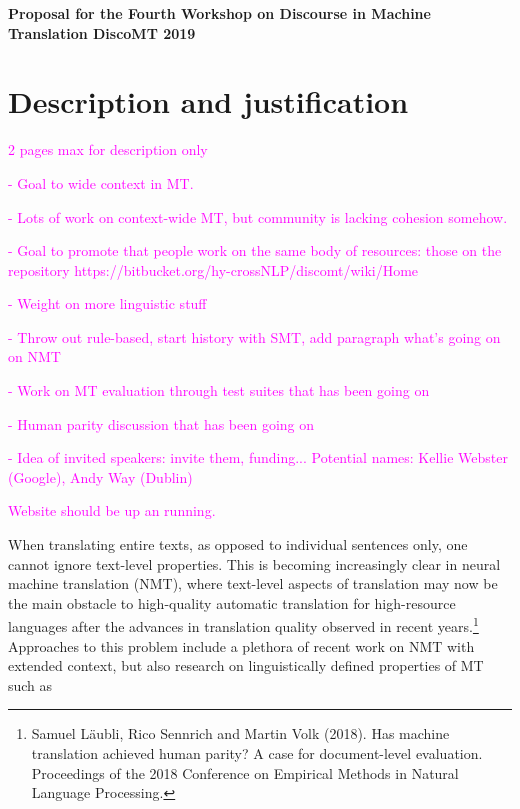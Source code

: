 \documentclass[11pt]{article}
\begin{document}
\begin{center}
\Large{\textbf{Proposal for the Fourth Workshop on Discourse in Machine Translation DiscoMT 2019}}
\end{center}

\section{Description and justification}

\textcolor{magenta}{2 pages max for description only}

\textcolor{magenta}{- Goal to wide context in MT.} 

\textcolor{magenta}{- Lots of work on context-wide MT, but community is lacking cohesion somehow.}

\textcolor{magenta}{- Goal to promote that people work on the same body of resources: those on the repository https://bitbucket.org/hy-crossNLP/discomt/wiki/Home } 

\textcolor{magenta}{- Weight on more linguistic stuff}

\textcolor{magenta}{- Throw out rule-based, start history with SMT, add paragraph what's going on on NMT}

\textcolor{magenta}{- Work on MT evaluation through test suites that has been going on}

\textcolor{magenta}{- Human parity discussion that has been going on }

\textcolor{magenta}{- Idea of invited speakers: invite them, funding... Potential names: Kellie Webster (Google), Andy Way (Dublin)}

\textcolor{magenta}{Website should be up an running. }

When translating entire texts, as opposed to individual sentences only, 
one cannot ignore text-level properties. This is becoming increasingly
clear in neural machine translation (NMT), where text-level aspects of
translation may now be the main obstacle to high-quality automatic
translation for high-resource languages after the advances in translation
quality observed in recent years.\footnote{Samuel Läubli, Rico Sennrich
and Martin Volk (2018). Has machine translation achieved human parity? A case
for document-level evaluation. Proceedings of the 2018 Conference on
Empirical Methods in Natural Language Processing.} Approaches to this
problem include a plethora of recent work on NMT with extended context, but also
research on linguistically defined properties of MT such as
\end{document}
